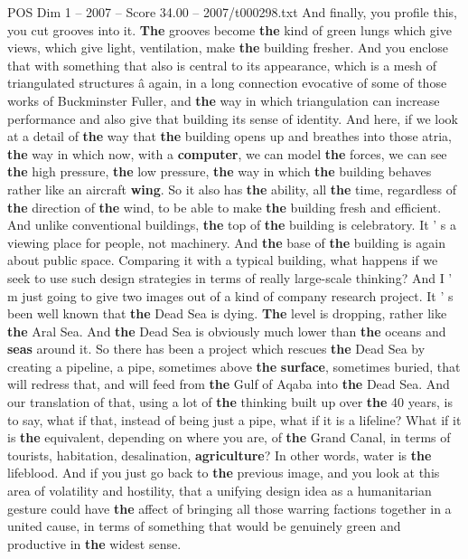 \begin{textsample}{POS Dim 1 – 2007 – Score 34.00 – 2007/t000298.txt}
And finally, you profile this, you cut grooves into it. \textbf{The} grooves become \textbf{the} kind of green lungs which give views, which give light, ventilation, make \textbf{the} building fresher.
And you enclose that with something that also is central to its appearance, which is a mesh of triangulated structures â again, in a long connection evocative of some of those works of Buckminster Fuller, and \textbf{the} way in which triangulation can increase performance and also give that building its sense of identity.
And here, if we look at a detail of \textbf{the} way that \textbf{the} building opens up and breathes into those atria, \textbf{the} way in which now, with a \textbf{computer}, we can model \textbf{the} forces, we can see \textbf{the} high pressure, \textbf{the} low pressure, \textbf{the} way in which \textbf{the} building behaves rather like an aircraft \textbf{wing}.
So it also has \textbf{the} ability, all \textbf{the} time, regardless of \textbf{the} direction of \textbf{the} wind, to be able to make \textbf{the} building fresh and efficient.
And unlike conventional buildings, \textbf{the} top of \textbf{the} building is celebratory.
It ' s a viewing place for people, not machinery.
And \textbf{the} base of \textbf{the} building is again about public space.
Comparing it with a typical building, what happens if we seek to use such design strategies in terms of really large-scale thinking?
And I ' m just going to give two images out of a kind of company research project.
It ' s been well known that \textbf{the} Dead Sea is dying. \textbf{The} level is dropping, rather like \textbf{the} Aral Sea.
And \textbf{the} Dead Sea is obviously much lower than \textbf{the} oceans and \textbf{seas} around it.
So there has been a project which rescues \textbf{the} Dead Sea by creating a pipeline, a pipe, sometimes above \textbf{the} \textbf{surface}, sometimes buried, that will redress that, and will feed from \textbf{the} Gulf of Aqaba into \textbf{the} Dead Sea.
And our translation of that, using a lot of \textbf{the} thinking built up over \textbf{the} 40 years, is to say, what if that, instead of being just a pipe, what if it is a lifeline?
What if it is \textbf{the} equivalent, depending on where you are, of \textbf{the} Grand Canal, in terms of tourists, habitation, desalination, \textbf{agriculture}?
In other words, water is \textbf{the} lifeblood.
And if you just go back to \textbf{the} previous image, and you look at this area of volatility and hostility, that a unifying design idea as a humanitarian gesture could have \textbf{the} affect of bringing all those warring factions together in a united cause, in terms of something that would be genuinely green and productive in \textbf{the} widest sense.

\end{textsample}

